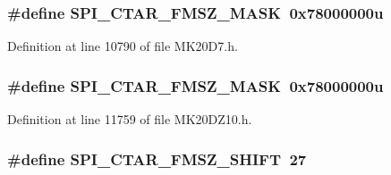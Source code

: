\subsubsection[{\texorpdfstring{S\+P\+I\+\_\+\+C\+T\+A\+R\+\_\+\+F\+M\+S\+Z\+\_\+\+M\+A\+SK}{SPI_CTAR_FMSZ_MASK}}]{\setlength{\rightskip}{0pt plus 5cm}\#define S\+P\+I\+\_\+\+C\+T\+A\+R\+\_\+\+F\+M\+S\+Z\+\_\+\+M\+A\+SK~0x78000000u}\hypertarget{group___s_p_i___register___masks_ga71b046a902929cf107f46e422092ff33}{}\label{group___s_p_i___register___masks_ga71b046a902929cf107f46e422092ff33}


Definition at line 10790 of file M\+K20\+D7.\+h.

\subsubsection[{\texorpdfstring{S\+P\+I\+\_\+\+C\+T\+A\+R\+\_\+\+F\+M\+S\+Z\+\_\+\+M\+A\+SK}{SPI_CTAR_FMSZ_MASK}}]{\setlength{\rightskip}{0pt plus 5cm}\#define S\+P\+I\+\_\+\+C\+T\+A\+R\+\_\+\+F\+M\+S\+Z\+\_\+\+M\+A\+SK~0x78000000u}\hypertarget{group___s_p_i___register___masks_ga71b046a902929cf107f46e422092ff33}{}\label{group___s_p_i___register___masks_ga71b046a902929cf107f46e422092ff33}


Definition at line 11759 of file M\+K20\+D\+Z10.\+h.

\subsubsection[{\texorpdfstring{S\+P\+I\+\_\+\+C\+T\+A\+R\+\_\+\+F\+M\+S\+Z\+\_\+\+S\+H\+I\+FT}{SPI_CTAR_FMSZ_SHIFT}}]{\setlength{\rightskip}{0pt plus 5cm}\#define S\+P\+I\+\_\+\+C\+T\+A\+R\+\_\+\+F\+M\+S\+Z\+\_\+\+S\+H\+I\+FT~27}\hypertarget{group___s_p_i___register___masks_gaabebaa480c90d32ad8bc580ea2507b8e}{}\label{group___s_p_i___register___masks_gaabebaa480c90d32ad8bc580ea2507b8e}


